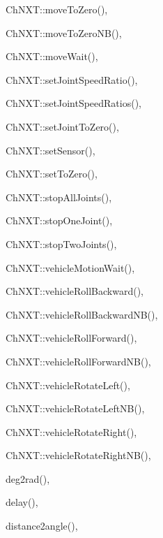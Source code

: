 \begin{theindex}
  \item ChNXT::moveToZero(), 
  \item ChNXT::moveToZeroNB(), 
  \item ChNXT::moveWait(), 
  \item ChNXT::setJointSpeedRatio(), 
  \item ChNXT::setJointSpeedRatios(), 
  \item ChNXT::setJointToZero(), 
  \item ChNXT::setSensor(), 
  \item ChNXT::setToZero(), 
  \item ChNXT::stopAllJoints(), 
  \item ChNXT::stopOneJoint(), 
  \item ChNXT::stopTwoJoints(), 
  \item ChNXT::vehicleMotionWait(), 
  \item ChNXT::vehicleRollBackward(), 
  \item ChNXT::vehicleRollBackwardNB(), 
  \item ChNXT::vehicleRollForward(), 
  \item ChNXT::vehicleRollForwardNB(), 
  \item ChNXT::vehicleRotateLeft(), 
  \item ChNXT::vehicleRotateLeftNB(), 
  \item ChNXT::vehicleRotateRight(), 
  \item ChNXT::vehicleRotateRightNB(), 

  \indexspace

  \item deg2rad(), 
  \item delay(), 
  \item distance2angle(), 

  \indexspace


\end{theindex}
